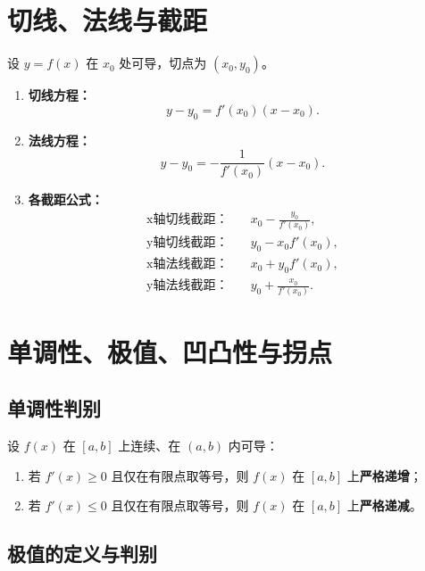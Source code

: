 
\section{切线、法线与截距}
\DTwoTwo

设 $y = f(x)$ 在 $x_0$ 处可导，切点为 $(x_0, y_0)$。

\begin{enumerate}
    \item \textbf{切线方程：}
          \[
              y - y_0 = f'(x_0)(x - x_0).
          \]
    \item \textbf{法线方程：}
          \[
              y - y_0 = -\frac{1}{f'(x_0)}(x - x_0).
          \]
    \item \textbf{各截距公式：}
          \[
              \begin{aligned}
                  \text{x轴切线截距：} & \quad x_0 - \frac{y_0}{f'(x_0)}, \\
                  \text{y轴切线截距：} & \quad y_0 - x_0 f'(x_0),         \\
                  \text{x轴法线截距：} & \quad x_0 + y_0 f'(x_0),         \\
                  \text{y轴法线截距：} & \quad y_0 + \frac{x_0}{f'(x_0)}.
              \end{aligned}
          \]
\end{enumerate}


\section{单调性、极值、凹凸性与拐点}
\DTwoTwo
\subsection{单调性判别}

设 $f(x)$ 在 $[a,b]$ 上连续、在 $(a,b)$ 内可导：
\begin{enumerate}
    \item 若 $f'(x) \ge 0$ 且仅在有限点取等号，则 $f(x)$ 在 $[a,b]$ 上\textbf{严格递增}；
    \item 若 $f'(x) \le 0$ 且仅在有限点取等号，则 $f(x)$ 在 $[a,b]$ 上\textbf{严格递减}。
\end{enumerate}

\subsection{极值的定义与判别}

